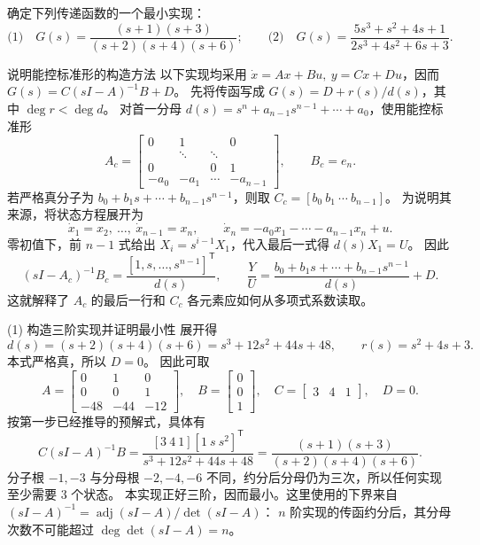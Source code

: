 \documentclass[11pt]{article}
\begin{document}
\begin{problem}[原题 4]
确定下列传递函数的一个最小实现：
\[
\text{(1)}\quad G(s)=\frac{(s+1)(s+3)}{(s+2)(s+4)(s+6)};\qquad
\text{(2)}\quad G(s)=\frac{5s^3+s^2+4s+1}{2s^3+4s^2+6s+3}.
\]
\end{problem}
\begin{solution}
\begin{proofstep}{说明能控标准形的构造方法}
以下实现均采用 $\dot x=Ax+Bu,\ y=Cx+Du$，因而 $G(s)=C(sI-A)^{-1}B+D$。
先将传函写成 $G(s)=D+r(s)/d(s)$，其中 $\deg r<\deg d$。
对首一分母 $d(s)=s^n+a_{n-1}s^{n-1}+\cdots+a_0$，使用能控标准形
\[
A_c=\begin{bmatrix}0&1&&0\\ &\ddots&\ddots&\\0&&0&1\\-a_0&-a_1&\cdots&-a_{n-1}\end{bmatrix},\qquad B_c=e_n.
\]
若严格真分子为 $b_0+b_1s+\cdots+b_{n-1}s^{n-1}$，则取 $C_c=[b_0\ b_1\ \cdots\ b_{n-1}]$。
为说明其来源，将状态方程展开为
\[
\dot x_1=x_2,\ \ldots,\ \dot x_{n-1}=x_n,\qquad
\dot x_n=-a_0x_1-\cdots-a_{n-1}x_n+u.
\]
零初值下，前 $n-1$ 式给出 $X_i=s^{i-1}X_1$，代入最后一式得 $d(s)X_1=U$。
因此
\[
(sI-A_c)^{-1}B_c=\frac{[1,s,\ldots,s^{n-1}]^{\mathsf T}}{d(s)},\qquad
\frac YU=\frac{b_0+b_1s+\cdots+b_{n-1}s^{n-1}}{d(s)}+D.
\]
这就解释了 $A_c$ 的最后一行和 $C_c$ 各元素应如何从多项式系数读取。
\end{proofstep}

\begin{proofstep}{(1) 构造三阶实现并证明最小性}
展开得
\[
d(s)=(s+2)(s+4)(s+6)=s^3+12s^2+44s+48,\qquad r(s)=s^2+4s+3.
\]
本式严格真，所以 $D=0$。
因此可取
\[
\boxed{A=\begin{bmatrix}0&1&0\\0&0&1\\-48&-44&-12\end{bmatrix},\quad
B=\begin{bmatrix}0\\0\\1\end{bmatrix},\quad
C=\begin{bmatrix}3&4&1\end{bmatrix},\quad D=0.}
\]
按第一步已经推导的预解式，具体有
\[
C(sI-A)^{-1}B
=\frac{[3\ 4\ 1][1\ s\ s^2]^{\mathsf T}}{s^3+12s^2+44s+48}
=\frac{(s+1)(s+3)}{(s+2)(s+4)(s+6)}.
\]
分子根 $-1,-3$ 与分母根 $-2,-4,-6$ 不同，约分后分母仍为三次，所以任何实现至少需要 3 个状态。
本实现正好三阶，因而最小。这里使用的下界来自
$(sI-A)^{-1}=\operatorname{adj}(sI-A)/\det(sI-A)$：
$n$ 阶实现的传函约分后，其分母次数不可能超过 $\deg\det(sI-A)=n$。
\end{proofstep}


\end{solution}
\end{document}
